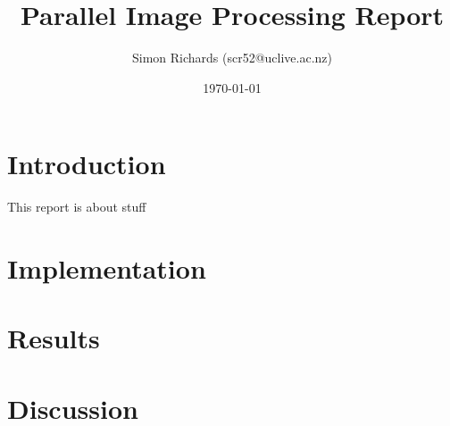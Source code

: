 \documentclass{article}
\title{Parallel Image Processing Report}
\date{\today}
\author{Simon Richards (scr52@uclive.ac.nz)}
\begin{document}
\maketitle
\section{Introduction}
This report is about stuff

\section{Implementation}

\section{Results}

\section{Discussion}
\end{document}
